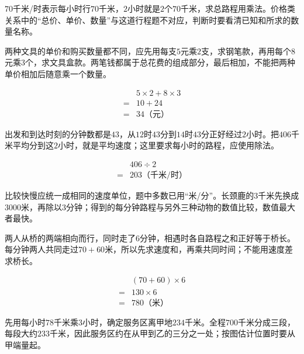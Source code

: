 \documentclass[multi=snippet,border=0pt]{standalone}
\newenvironment{snippet}[3]{\begin{minipage}{#1bp}\color{answerred}\fontsize{#2}{#3}\selectfont\raggedright}{\end{minipage}}
\begin{document}
\begin{snippet}{505}{11.5}{14}\(70\)千米/时表示每小时行\(70\)千米，\(2\)小时就是\(2\)个\(70\)千米，求总路程用乘法。价格类关系中的“总价、单价、数量”与这道行程题不对应，判断时要看清已知和所求的数量名称。\end{snippet}
\begin{snippet}{505}{11.5}{14}两种文具的单价和购买数量都不同，应先用每支\(5\)元乘\(2\)支，求钢笔款，再用每个\(8\)元乘\(3\)个，求文具盒款。两笔钱都属于总花费的组成部分，最后相加，不能把两种单价相加后随意乘一个数量。\par \[\begin{aligned}&5\times2+8\times3\\={}&10+24\\={}&34\text{（元）}\end{aligned}\]\end{snippet}
\begin{snippet}{505}{11.5}{14}出发和到达时刻的分钟数都是\(43\)，从\(12\)时\(43\)分到\(14\)时\(43\)分正好经过\(2\)小时。把\(406\)千米平均分到这\(2\)小时，就是平均速度；这里要求每小时的路程，应使用除法。\par \[\begin{aligned}&406\div2\\={}&203\text{（千米/时）}\end{aligned}\]\end{snippet}
\begin{snippet}{505}{11.5}{14}比较快慢应统一成相同的速度单位，题中多数已用“米/分”。长颈鹿的\(3\)千米先换成\(3000\)米，再除以\(3\)分钟；得到的每分钟路程与另外三种动物的数值比较，数值最大者最快。\end{snippet}
\begin{snippet}{505}{11.5}{14}两人从桥的两端相向而行，同时走了\(6\)分钟，相遇时各自路程之和正好等于桥长。每分钟两人共同走过\(70+60\)米，所以先求速度和，再乘共同时间；不能用速度差求桥长。\par \[\begin{aligned}&(70+60)\times6\\={}&130\times6\\={}&780\text{（米）}\end{aligned}\]\end{snippet}
\begin{snippet}{505}{11.5}{14}先用每小时\(78\)千米乘\(3\)小时，确定服务区离甲地\(234\)千米。全程\(700\)千米分成三段，每段大约\(233\)千米，因此服务区约在从甲到乙的三分之一处；按图估计位置时要从甲端量起。\end{snippet}
\end{document}
